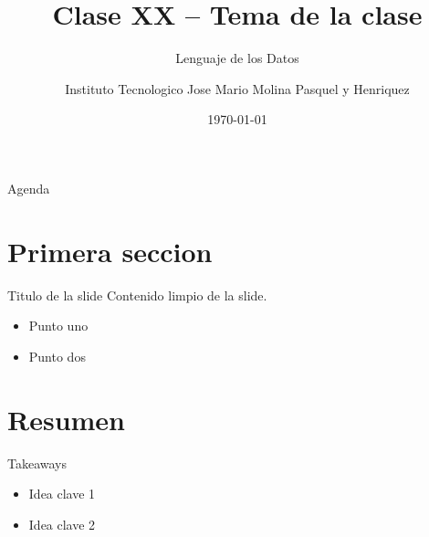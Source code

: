 \documentclass[aspectratio=169]{beamer}
\title{Clase XX -- Tema de la clase}
\subtitle{Lenguaje de los Datos}
\author{Instituto Tecnologico Jose Mario Molina Pasquel y Henriquez}
\date{\today}
\begin{document}
\begin{frame}[plain]
  \titlepage
\end{frame}

\begin{frame}{Agenda}
  \tableofcontents
\end{frame}

\section{Primera seccion}

\begin{frame}{Titulo de la slide}
  Contenido limpio de la slide.
  \begin{itemize}
    \item Punto uno
    \item Punto dos
  \end{itemize}
\end{frame}

\section{Resumen}

\begin{frame}{Takeaways}
  \begin{itemize}
    \item Idea clave 1
    \item Idea clave 2
  \end{itemize}
\end{frame}
\end{document}
